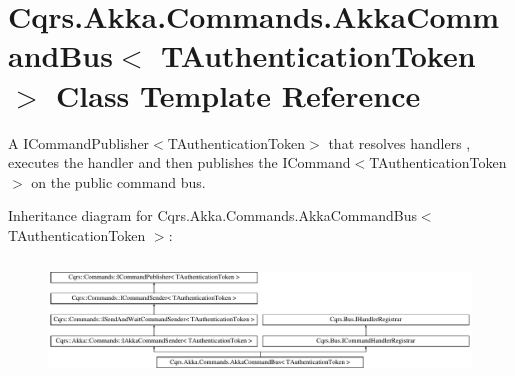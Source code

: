 \hypertarget{classCqrs_1_1Akka_1_1Commands_1_1AkkaCommandBus}{}\section{Cqrs.\+Akka.\+Commands.\+Akka\+Command\+Bus$<$ T\+Authentication\+Token $>$ Class Template Reference}
\label{classCqrs_1_1Akka_1_1Commands_1_1AkkaCommandBus}


A I\+Command\+Publisher$<$\+T\+Authentication\+Token$>$ that resolves handlers , executes the handler and then publishes the I\+Command$<$\+T\+Authentication\+Token$>$ on the public command bus.  


Inheritance diagram for Cqrs.\+Akka.\+Commands.\+Akka\+Command\+Bus$<$ T\+Authentication\+Token $>$\+:\begin{figure}[H]
\begin{center}
\leavevmode
\includegraphics[height=3.189066cm]{classCqrs_1_1Akka_1_1Commands_1_1AkkaCommandBus}
\end{center}
\end{figure}
